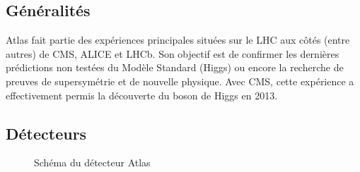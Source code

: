 \documentclass[11pt]{article} %
\begin{document}
\subsection{Généralités}

Atlas fait partie des expériences principales situées sur le LHC aux côtés (entre autres) de CMS, ALICE et LHCb. Son objectif est de confirmer les dernières prédictions non testées du Modèle Standard (Higgs) ou encore la recherche de preuves de supersymétrie et de nouvelle physique. Avec CMS, cette expérience a effectivement permis la découverte du boson de Higgs en 2013.

\subsection{Détecteurs}

\begin{figure}[H]
\centering
  \caption{Schéma du détecteur Atlas}
\label{fig:atlas_detector}

\end{figure}
\end{document}

